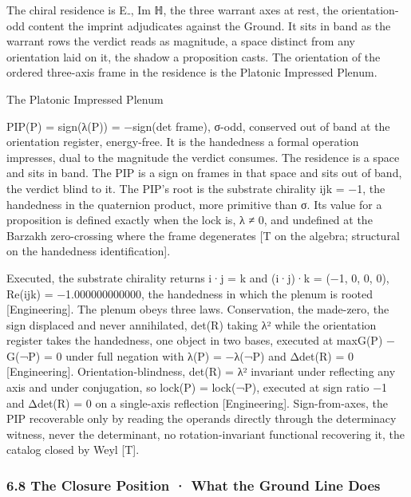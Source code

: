 \documentclass[10pt,twocolumn]{article}
\begin{document}
The chiral residence is E₋, Im ℍ, the three warrant axes at rest, the
orientation-odd content the imprint adjudicates against the Ground. It
sits in band as the warrant rows the verdict reads as magnitude, a space
distinct from any orientation laid on it, the shadow a proposition
casts. The orientation of the ordered three-axis frame in the residence
is the Platonic Impressed Plenum.

\begin{jbox}{The Platonic Impressed Plenum}

PIP(P) = sign(λ(P)) = −sign(det frame), σ-odd, conserved out of band at
the orientation register, energy-free. It is the handedness a formal
operation impresses, dual to the magnitude the verdict consumes. The
residence is a space and sits in band. The PIP is a sign on frames in
that space and sits out of band, the verdict blind to it. The PIP's root
is the substrate chirality ijk = −1, the handedness in the quaternion
product, more primitive than σ. Its value for a proposition is defined
exactly when the lock is, λ ≠ 0, and undefined at the Barzakh
zero-crossing where the frame degenerates {[}T on the algebra;
structural on the handedness identification{]}.

\end{jbox}

Executed, the substrate chirality returns i·j = k and (i·j)·k = (−1, 0,
0, 0), Re(ijk) = −1.000000000000, the handedness in which the plenum is
rooted {[}Engineering{]}. The plenum obeys three laws. Conservation, the
made-zero, the sign displaced and never annihilated, det(R) taking λ²
while the orientation register takes the handedness, one object in two
bases, executed at max\textbar G(P) − G(¬P)\textbar{} = 0 under full
negation with λ(P) = −λ(¬P) and \textbar Δdet(R)\textbar{} = 0
{[}Engineering{]}. Orientation-blindness, det(R) = λ² invariant under
reflecting any axis and under conjugation, so lock(P) = lock(¬P),
executed at sign ratio −1 and \textbar Δdet(R)\textbar{} = 0 on a
single-axis reflection {[}Engineering{]}. Sign-from-axes, the PIP
recoverable only by reading the operands directly through the
determinacy witness, never the determinant, no rotation-invariant
functional recovering it, the catalog closed by Weyl {[}T{]}.

\hypertarget{the-closure-position-what-the-ground-line-does}{%
\subsubsection{6.8 The Closure Position · What the Ground Line
Does}\label{the-closure-position-what-the-ground-line-does}}
\end{document}
